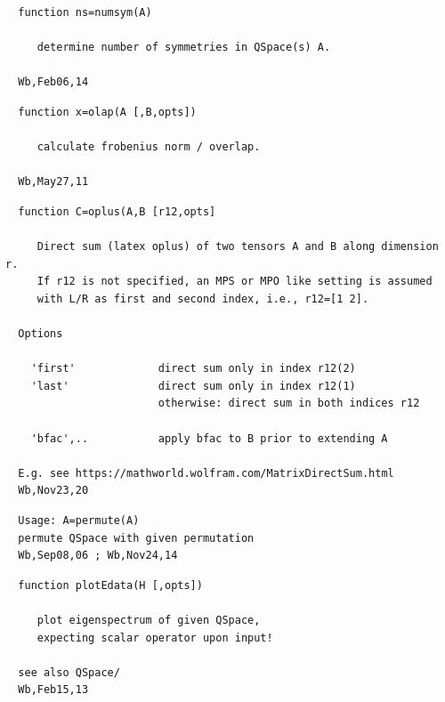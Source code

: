 \documentclass[twoside,12pt]{article}
\begin{document}
\pagebreak[3]



\begin{verbatim}
  function ns=numsym(A)
 
     determine number of symmetries in QSpace(s) A.
 
  Wb,Feb06,14
\end{verbatim}

\pagebreak[3]



\begin{verbatim}
  function x=olap(A [,B,opts])
 
     calculate frobenius norm / overlap.
 
  Wb,May27,11
\end{verbatim}

\pagebreak[3]



\begin{verbatim}
  function C=oplus(A,B [r12,opts]
 
     Direct sum (latex oplus) of two tensors A and B along dimension r.
     If r12 is not specified, an MPS or MPO like setting is assumed
     with L/R as first and second index, i.e., r12=[1 2].
 
  Options
 
    'first'             direct sum only in index r12(2)
    'last'              direct sum only in index r12(1)
                        otherwise: direct sum in both indices r12
 
    'bfac',..           apply bfac to B prior to extending A
 
  E.g. see https://mathworld.wolfram.com/MatrixDirectSum.html
  Wb,Nov23,20
\end{verbatim}

\pagebreak[3]



\begin{verbatim}
  Usage: A=permute(A)
  permute QSpace with given permutation
  Wb,Sep08,06 ; Wb,Nov24,14
\end{verbatim}

\pagebreak[3]



\begin{verbatim}
  function plotEdata(H [,opts])
 
     plot eigenspectrum of given QSpace,
     expecting scalar operator upon input!
 
  see also QSpace/
  Wb,Feb15,13
\end{verbatim}
\end{document}
